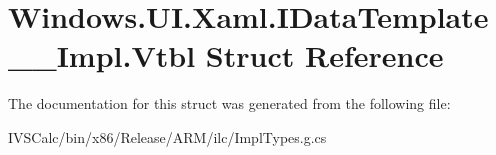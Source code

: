 \hypertarget{struct_windows_1_1_u_i_1_1_xaml_1_1_i_data_template_____impl_1_1_vtbl}{}\section{Windows.\+U\+I.\+Xaml.\+I\+Data\+Template\+\_\+\+\_\+\+Impl.\+Vtbl Struct Reference}
\label{struct_windows_1_1_u_i_1_1_xaml_1_1_i_data_template_____impl_1_1_vtbl}


The documentation for this struct was generated from the following file\+:\begin{DoxyCompactItemize}
\item 
I\+V\+S\+Calc/bin/x86/\+Release/\+A\+R\+M/ilc/Impl\+Types.\+g.\+cs\end{DoxyCompactItemize}
